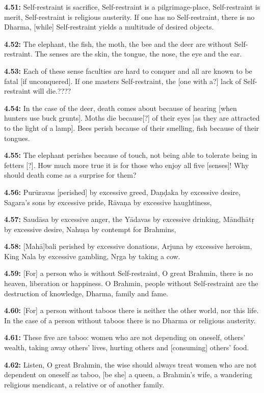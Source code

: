 \documentclass{article}
\newcommand{\vsnum}[1]{\textbf{#1}}
\begin{document}
\vsnum{4.51: } Self-restraint is sacrifice, Self-restraint is a pilgrimage-place, Self-restraint is merit, Self-restraint is religious austerity. If one has no Self-restraint, there is no Dharma, [while] Self-restraint yields a multitude of desired objects.

\vsnum{4.52: }The elephant, the fish, the moth, the bee and the deer are without Self-restraint. The senses are the skin, the tongue, the nose, the eye and the ear.

\vsnum{4.53: }Each of these sense faculties are hard to conquer and all are known to be fatal [if unconquered]. If one masters Self-restraint, the [one with a?] lack of Self-restraint will die.???? 

\vsnum{4.54: }In the case of the deer, death comes about because of hearing [when hunters use buck grunts]. Moths die because[?] of their eyes [as they are attracted to the light of a lamp]. Bees perish because of their smelling, fish because of their tongues.

\vsnum{4.55: }The elephant perishes because of touch, not being able to tolerate being in fetters [?]. How much more true it is for those who enjoy all five [senses]! Why should death come as a surprise for them?

\vsnum{4.56: }Purūravas [perished] by excessive greed, Daṇḍaka by excessive desire, Sagara's sons by excessive pride, Rāvaṇa by excessive haughtiness,

\vsnum{4.57: }Saudāsa by excessive anger, the Yādavas by excessive drinking, Māndhātṛ by excessive desire, Nahuṣa by contempt for Brahmins,

\vsnum{4.58: }[Mahā]bali perished by excessive donations, Arjuna by excessive heroism, King Nala by excessive gambling, Nṛga by taking a cow.

\vsnum{4.59: }[For] a person who is without Self-restraint, O great Brahmin, there is no heaven, liberation or happiness. O Brahmin, people without Self-restraint are the destruction of knowledge, Dharma, family and fame.

\vsnum{4.60: }[For] a person without taboos there is neither the other world, nor this life. In the case of a person without taboos there is no Dharma or religious austerity.

\vsnum{4.61: }These five are taboo: women who are not depending on oneself, others' wealth, taking away others' lives, hurting others and [consuming] others' food.

\vsnum{4.62: }Listen, O great Brahmin, the wise should always treat women who are not dependent on oneself as taboo, [be she] a queen, a Brahmin's wife, a wandering religious mendicant, a relative or of another family.
\end{document}
